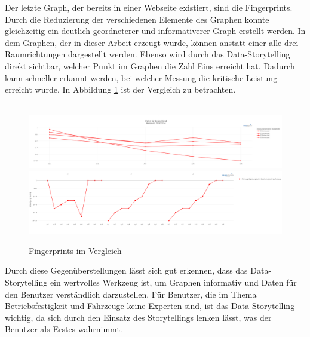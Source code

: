 \noindent
Der letzte Graph, der bereits in einer Webseite existiert, sind die Fingerprints. Durch die Reduzierung der verschiedenen Elemente des Graphen konnte gleichzeitig ein deutlich geordneterer und informativerer Graph erstellt werden. In dem Graphen, der in dieser Arbeit erzeugt wurde, können anstatt einer alle drei Raumrichtungen dargestellt werden. Ebenso wird durch das Data-Storytelling direkt sichtbar, welcher Punkt im Graphen die Zahl Eins erreicht hat. Dadurch kann schneller erkannt werden, bei welcher Messung die kritische Leistung erreicht wurde. In Abbildung \ref{fig:fingerprints_compare} ist der Vergleich zu betrachten.\\\\ 
\begin{figure}[!h]
    \centering
    \includegraphics[width=1\linewidth]{gfx/fingerprints_old.png}
        \includegraphics[width=1\linewidth]{gfx/fingerprints_new.png}
    \caption{Fingerprints im Vergleich}
    \label{fig:fingerprints_compare}
\end{figure}
\noindent
Durch diese Gegenüberstellungen lässt sich gut erkennen, dass das Data-Storytelling ein wertvolles Werkzeug ist, um Graphen informativ und Daten für den Benutzer verständlich darzustellen. Für Benutzer, die im Thema Betriebsfestigkeit und Fahrzeuge keine Experten sind, ist das Data-Storytelling wichtig, da sich durch den Einsatz des Storytellings lenken lässt, was der Benutzer als Erstes wahrnimmt.  
